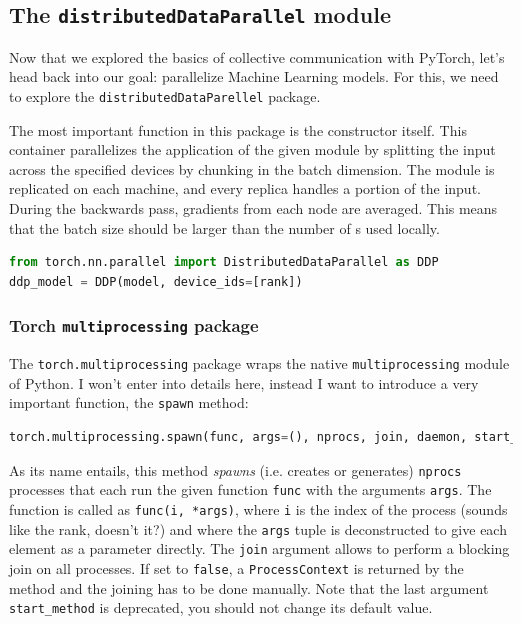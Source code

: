 \documentclass{article}
\begin{document}
\subsection{The \texorpdfstring{\lstinline{distributedDataParallel}}{distributedDataParallel} module}
Now that we explored the basics of collective communication with PyTorch, let's head back into our goal: parallelize Machine Learning models. For this, we need to explore the \lstinline{distributedDataParellel} package.

The most important function in this package is the constructor itself. This container parallelizes the application of the given module by splitting the input across the specified devices by chunking in the batch dimension. The module is replicated on each machine, and every replica handles a portion of the input. During the backwards pass, gradients from each node are averaged. This means that the batch size should be larger than the number of s used locally.

\begin{lstlisting}[language=Python]
from torch.nn.parallel import DistributedDataParallel as DDP
ddp_model = DDP(model, device_ids=[rank])
\end{lstlisting}

\subsubsection{Torch \texorpdfstring{\lstinline{multiprocessing}}{multiprocessing} package}
The \lstinline{torch.multiprocessing} package wraps the native \lstinline{multiprocessing} module of Python. I won't enter into details here, instead I want to introduce a very important function, the \lstinline{spawn} method:
\begin{lstlisting}[language=Python]
torch.multiprocessing.spawn(func, args=(), nprocs, join, daemon, start_method='spawn')
\end{lstlisting}
As its name entails, this method \textit{spawns} (i.e. creates or generates) \lstinline{nprocs} processes that each run the given function \lstinline{func} with the arguments \lstinline{args}. The function is called as \lstinline{func(i, *args)}, where \lstinline{i} is the index of the process (sounds like the rank, doesn't it?) and where the \lstinline{args} tuple is deconstructed to give each element as a parameter directly. The \lstinline{join} argument allows to perform a blocking join on all processes. If set to \lstinline{false}, a \lstinline{ProcessContext} is returned by the method and the joining has to be done manually. Note that the last argument \lstinline{start_method} is deprecated, you should not change its default value.
\end{document}
